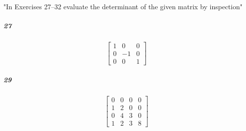 \documentclass[fleqn]{article}
\begin{document}
\pagebreak
 "In Exercises 27–32  evaluate the determinant of the given matrix by inspection"

\subparagraph{27}

\[
\begin{bmatrix} 1 & 0 & 0 \\ 0 & -1 & 0 \\ 0 & 0 & 1 \end{bmatrix}
\]
\vfill



\subparagraph{29}

\[
\begin{bmatrix} 0 & 0 & 0 & 0 \\ 1 & 2 & 0 & 0 \\ 0 & 4 & 3 & 0 \\ 1 & 2 & 3 & 8 \end{bmatrix}
\]
\vfill


\pagebreak
\end{document}
